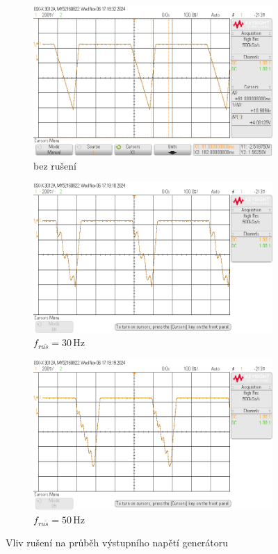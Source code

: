 \documentclass[a4paper, czech]{article}
\begin{document}
\begin{figure}[H]
    \centering
    \begin{subfigure}{0.49\textwidth}
        \includegraphics[width=\textwidth]{osc_6B_4.png}
        \caption{bez rušení}
    \end{subfigure}
    \hfil
    \begin{subfigure}{0.49\textwidth}
        \includegraphics[width=\textwidth]{osc_6B_5.png}
        \caption{$f_{ru \check{s}} = 30\,$Hz}
    \end{subfigure}

    \begin{subfigure}{0.49\textwidth}
        \includegraphics[width=\textwidth]{osc_6B_6.png}
        \caption{$f_{ru \check{s}} = 50\,$Hz}
    \end{subfigure}
    \caption{Vliv rušení na průběh výstupního napětí generátoru}
\end{figure}
\end{document}
